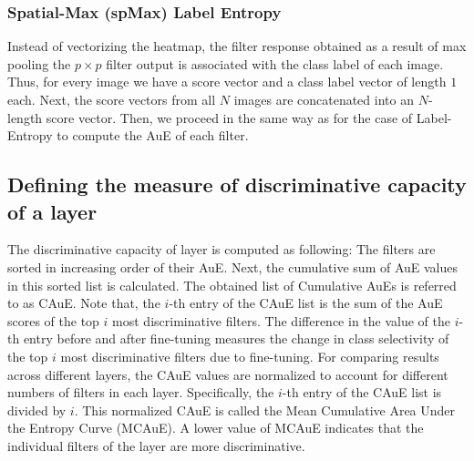 \subsubsection{Spatial-Max (spMax) Label Entropy}
\label{sub:def-spmax-label-ent}
Instead of vectorizing the heatmap, the filter response obtained as a result of max pooling the $p \times p$ filter output is associated with the class label of each image. Thus, for every image we have a score vector and a class label vector of length $1$ each.
Next, the score vectors from all $N$ images are concatenated into an $N$-length score vector.
Then, we proceed in the same way as for the case of Label-Entropy to compute the AuE of each filter. 

\subsection{Defining the measure of discriminative capacity of a layer}
The discriminative capacity of layer is computed as following: The filters are sorted in increasing order of their AuE.
Next, the cumulative sum of AuE values in this sorted list is calculated. The obtained list of Cumulative AuEs is referred to as CAuE. 
Note that, the $i$-th entry of the CAuE list is the sum of the AuE scores of the top $i$ most discriminative filters.
The difference in the value of the $i$-th entry before and after fine-tuning measures the change in class selectivity of the top $i$ most discriminative filters due to fine-tuning.
For comparing results across different layers, the CAuE values are normalized to account for different numbers of filters in each layer. 
Specifically, the $i$-th entry of the CAuE list is divided by $i$. 
This normalized CAuE is called the Mean Cumulative Area Under the Entropy Curve (MCAuE).
A lower value of MCAuE indicates that the individual filters of the layer are more discriminative.

